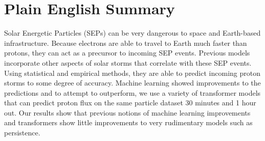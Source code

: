\section{Plain English Summary}
\label{sec:plain_english_summary}
Solar Energetic Particles (SEPs) can be very dangerous to space and Earth-based infrastructure. Because electrons are able to travel to Earth much faster than protons, they can act as a precursor to incoming SEP events. 
Previous models incorporate other aspects of solar storms that correlate with these SEP events. Using statistical and empirical methods, they are able to predict incoming proton storms to some degree of accuracy. 
Machine learning showed improvements to the predictions and to attempt to outperform, we use a variety of transformer models that can predict proton flux on the same particle dataset 30 minutes and 1 hour out. Our 
results show that previous notions of machine learning improvements and transformers show little improvements to very rudimentary models such as persistence.